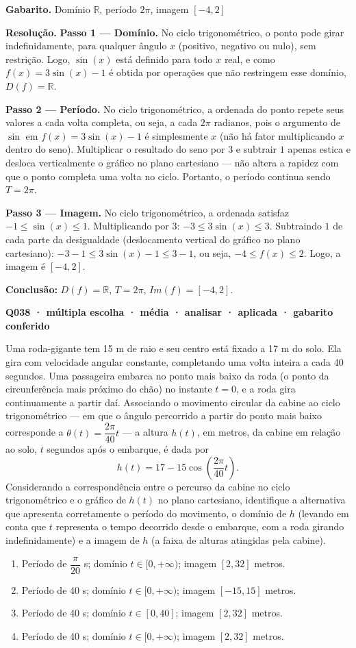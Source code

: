 \documentclass[11pt,a4paper]{article}
\begin{document}
\textbf{Gabarito.} Domínio $\mathbb{R}$, período $2\pi$, imagem $[-4, 2]$

\textbf{Resolução.} \textbf{Passo 1 — Domínio.} No ciclo trigonométrico, o ponto pode girar indefinidamente, para qualquer ângulo $x$ (positivo, negativo ou nulo), sem restrição. Logo, $\sin(x)$ está definido para todo $x$ real, e como $f(x)=3\sin(x)-1$ é obtida por operações que não restringem esse domínio, $D(f) = \mathbb{R}$.

\textbf{Passo 2 — Período.} No ciclo trigonométrico, a ordenada do ponto repete seus valores a cada volta completa, ou seja, a cada $2\pi$ radianos, pois o argumento de $\sin$ em $f(x)=3\sin(x)-1$ é simplesmente $x$ (não há fator multiplicando $x$ dentro do seno). Multiplicar o resultado do seno por $3$ e subtrair $1$ apenas estica e desloca verticalmente o gráfico no plano cartesiano — não altera a rapidez com que o ponto completa uma volta no ciclo. Portanto, o período continua sendo $T = 2\pi$.

\textbf{Passo 3 — Imagem.} No ciclo trigonométrico, a ordenada satisfaz $-1 \le \sin(x) \le 1$. Multiplicando por $3$: $-3 \le 3\sin(x) \le 3$. Subtraindo $1$ de cada parte da desigualdade (deslocamento vertical do gráfico no plano cartesiano): $-3-1 \le 3\sin(x)-1 \le 3-1$, ou seja, $-4 \le f(x) \le 2$. Logo, a imagem é $[-4, 2]$.

\textbf{Conclusão:} $D(f)=\mathbb{R}$, $T=2\pi$, $Im(f)=[-4,2]$.

\bigskip\noindent\textbf{Q038 · múltipla escolha · média · analisar · aplicada · gabarito conferido}\par\nopagebreak
Uma roda-gigante tem 15 m de raio e seu centro está fixado a 17 m do solo. Ela gira com velocidade angular constante, completando uma volta inteira a cada 40 segundos. Uma passageira embarca no ponto mais baixo da roda (o ponto da circunferência mais próximo do chão) no instante $t=0$, e a roda gira continuamente a partir daí. Associando o movimento circular da cabine ao ciclo trigonométrico — em que o ângulo percorrido a partir do ponto mais baixo corresponde a $\theta(t)=\dfrac{2\pi}{40}t$ — a altura $h(t)$, em metros, da cabine em relação ao solo, $t$ segundos após o embarque, é dada por
$$h(t) = 17 - 15\cos\left(\frac{2\pi}{40}t\right).$$
Considerando a correspondência entre o percurso da cabine no ciclo trigonométrico e o gráfico de $h(t)$ no plano cartesiano, identifique a alternativa que apresenta corretamente o período do movimento, o domínio de $h$ (levando em conta que $t$ representa o tempo decorrido desde o embarque, com a roda girando indefinidamente) e a imagem de $h$ (a faixa de alturas atingidas pela cabine).
\begin{enumerate}[label=(\alph*)]
\item Período de $\dfrac{\pi}{20}$ s; domínio $t \in [0, +\infty)$; imagem $[2, 32]$ metros.
\item Período de 40 s; domínio $t \in [0, +\infty)$; imagem $[-15, 15]$ metros.
\item Período de 40 s; domínio $t \in [0, 40]$; imagem $[2, 32]$ metros.
\item Período de 40 s; domínio $t \in [0, +\infty)$; imagem $[2, 32]$ metros.
\end{enumerate}
\end{document}
